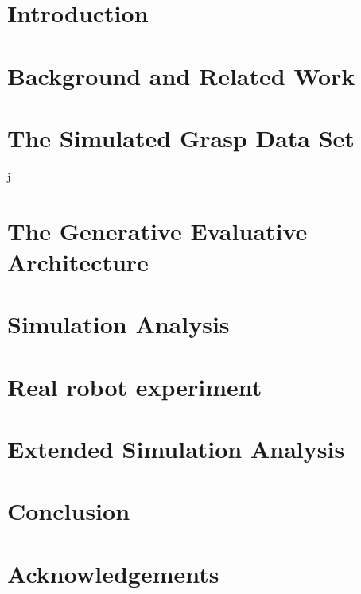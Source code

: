 \documentclass{ws-ijhr}
\begin{document}
\section{Introduction}



\section{Background and Related Work}



\section{The Simulated Grasp Data Set}
\label{section:simulation}j


\section{The Generative Evaluative Architecture} \label{section:evaluative}


\section{Simulation Analysis}
\label{section:simulationAnalysis}


\section{Real robot experiment}
\label{section:experiments}


\section{Extended Simulation Analysis}
\label{section:extendedSimulationAnalysis}


\section{Conclusion} 
\label{sec:conclusion}


\section*{Acknowledgements}
\end{document}
